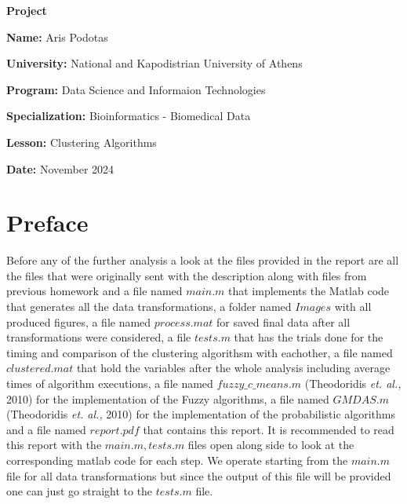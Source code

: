 \documentclass[12pt, a4paper]{article}
\begin{document}
\begin{titlepage}
    \centering
    {\huge \textbf{Project}\par}
    \vspace{0.5cm}
    {\Large \textbf{Name:} Aris Podotas\par}
    \vspace{0.5cm}
    {\large \textbf{University:} National and Kapodistrian University of Athens\par}
    \vspace{0.5cm}
    {\large \textbf{Program:} Data Science and Informaion Technologies\par}
    \vspace{0.5cm}
    {\large \textbf{Specialization:} Bioinformatics - Biomedical Data\par}
    \vspace{0.5cm}
    {\large \textbf{Lesson:} Clustering Algorithms \par}
    \vspace{0.5cm}
    {\large \textbf{Date:} November 2024\par}
    \tableofcontents
\end{titlepage}

\section{Preface}

Before any of the further analysis a look at the files provided in the report are all the files that were originally sent with the description along with files from previous homework and a file named $main.m$ that implements the Matlab code that generates all the data transformations, a folder named $Images$ with all produced figures, a file named $process.mat$ for saved final data after all transformations were considered, a file $tests.m$ that has the trials done for the timing and comparison of the clustering algorithsm with eachother, a file named $clustered.mat$ that hold the variables after the whole analysis including average times of algorithm executions, a file named $fuzzy\_c\_means.m$ (Theodoridis \textit{et. al.,} 2010) for the implementation of the Fuzzy algorithms, a file named $GMDAS.m$ (Theodoridis \textit{et. al.,} 2010) for the implementation of the probabilistic algorithms and a file named $report.pdf$ that contains this report. It is recommended to read this report with the $main.m, tests.m$ files open along side to look at the corresponding matlab code for each step. We operate starting from the $main.m$ file for all data transformations but since the output of this file will be provided one can just go straight to the $tests.m$ file.
\newline
\end{document}
